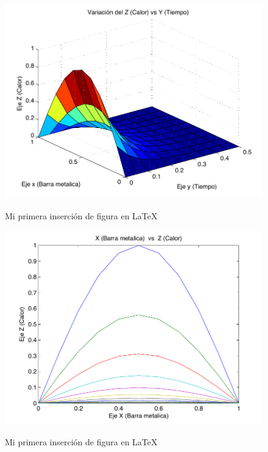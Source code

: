 \documentclass[a4paper, 11pt]{article}
\begin{document}
        \begin{figure}[ht]
            \centering
            \caption{Mi primera inserción de figura en \LaTeX}
            \includegraphics[width = 0.7\linewidth]{04_ENTORNOS_FLOTANTES/images/Grafica3D.pdf}
            \label{fig: Grafica3D - 3}
        \end{figure}

        \begin{figure}[ht]
            \centering
            \caption{Mi primera inserción de figura en \LaTeX}
            \includegraphics[scale = 1]{04_ENTORNOS_FLOTANTES/images/Grafica2D.pdf}
            \label{fig: Grafica2D - 1}
        \end{figure}
\end{document}
